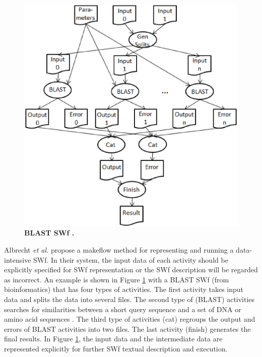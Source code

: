 \begin{figure}
\centering{}
\captionsetup{justification=centering}
\includegraphics[width=129mm]{figures/f4}\caption{\textbf{BLAST SWf \cite{Albrecht2012}. }}
\label{fig:f4} 
\end{figure}
Albrecht \textit{et al.} \cite{Albrecht2012} propose a makeflow method
for representing and running a data-intensive SWf. In their system,
the input data of each activity should be explicitly specified for
SWf representation or the SWf description will be regarded
as incorrect. An example is shown in Figure \ref{fig:f4} with a BLAST
SWf (from bioinformatics) that has four types of activities.
The first activity takes input data and splits the data into several
files. The second type of (BLAST) activities searches for similarities
between a short query sequence and a set of DNA or amino acid sequences
\cite{Korf2003}. The third type of activities (cat) regroups the
output and errors of BLAST activities into two files. The last activity
(finish) generates the final results. In Figure \ref{fig:f4}, the
input data and the intermediate data are represented explicitly for
further SWf textual description and execution.

